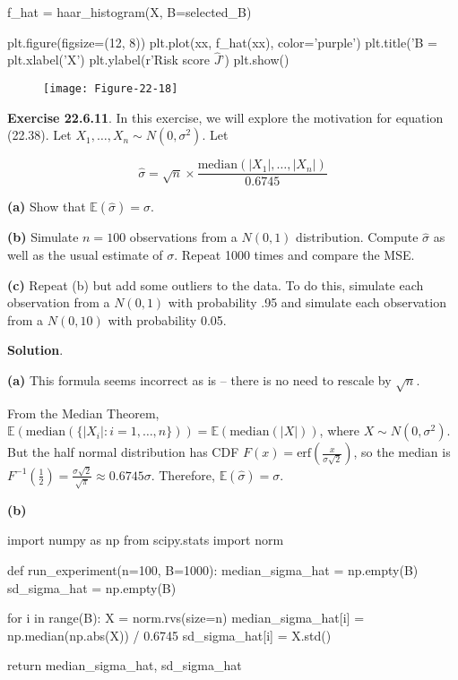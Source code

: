 \begin{python}
f_hat = haar_histogram(X, B=selected_B)

plt.figure(figsize=(12, 8))
plt.plot(xx, f_hat(xx), color='purple')
plt.title('B = %
plt.xlabel('X')
plt.ylabel(r'Risk score $\hat{J}$')
plt.show()
\end{python}

\begin{figure}[H]
\texttt{[image: Figure-22-18]}
\end{figure}

\textbf{Exercise 22.6.11}. In this exercise, we will explore the
motivation for equation (22.38). Let
\(X_1, \dots, X_n \sim N(0, \sigma^2)\). Let

\[ \hat{\sigma} = \sqrt{n} \times \frac{\text{median} (| X_1|, \dots, |X_n|)}{0.6745} \]

\textbf{(a)} Show that \(\mathbb{E}(\hat{\sigma}) = \sigma\).

\textbf{(b)} Simulate \(n = 100\) observations from a \(N(0, 1)\)
distribution. Compute \(\hat{\sigma}\) as well as the usual estimate of
\(\sigma\). Repeat 1000 times and compare the MSE.

\textbf{(c)} Repeat (b) but add some outliers to the data. To do this,
simulate each observation from a \(N(0, 1)\) with probability .95 and
simulate each observation from a \(N(0, 10)\) with probability 0.05.

\textbf{Solution}.

\textbf{(a)} This formula seems incorrect as is -- there is no need to
rescale by \(\sqrt{n}\).

From the Median Theorem,
\(\mathbb{E}(\text{median}( \{ |X_i| : i = 1, \dots, n \} )) = \mathbb{E}(\text{median}(|X|))\),
where \(X \sim N(0, \sigma^2)\). But the half normal distribution has
CDF \(F(x) = \text{erf}\left(\frac{x}{\sigma \sqrt{2}}\right)\), so the
median is
\(F^{-1}\left(\frac{1}{2}\right) = \frac{\sigma \sqrt{2}}{\sqrt{\pi}} \approx 0.6745 \sigma\).
Therefore, \(\mathbb{E}(\hat{\sigma}) = \sigma\).

\textbf{(b)}

\begin{python}
import numpy as np
from scipy.stats import norm

def run_experiment(n=100, B=1000):
    median_sigma_hat = np.empty(B)
    sd_sigma_hat = np.empty(B)
    
    for i in range(B):
        X = norm.rvs(size=n)
        median_sigma_hat[i] = np.median(np.abs(X)) / 0.6745
        sd_sigma_hat[i] = X.std()
    
    return median_sigma_hat, sd_sigma_hat
\end{python}

